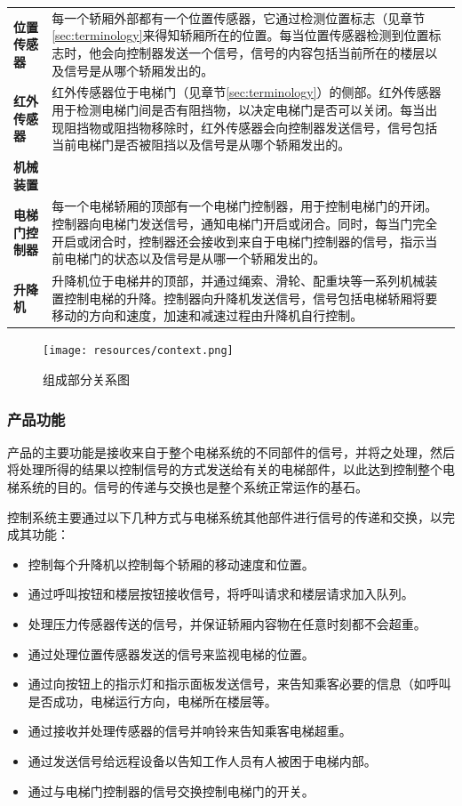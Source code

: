 \begin{longtable}{>{\flushright\textbf\bgroup}m{}<{\egroup} p{}}
	位置传感器 & 每一个轿厢外部都有一个位置传感器，它通过检测位置标志（见章节\ref{sec:terminology}来得知轿厢所在的位置。每当位置传感器检测到位置标志时，他会向控制器发送一个信号，信号的内容包括当前所在的楼层以及信号是从哪个轿厢发出的。\\
	红外传感器 & 红外传感器位于电梯门（见章节\ref{sec:terminology}）的侧部。红外传感器用于检测电梯门间是否有阻挡物，以决定电梯门是否可以关闭。每当出现阻挡物或阻挡物移除时，红外传感器会向控制器发送信号，信号包括当前电梯门是否被阻挡以及信号是从哪个轿厢发出的。\\
	\Large{机械装置} & \\
	电梯门控制器 & 每一个电梯轿厢的顶部有一个电梯门控制器，用于控制电梯门的开闭。控制器向电梯门发送信号，通知电梯门开启或闭合。同时，每当门完全开启或闭合时，控制器还会接收到来自于电梯门控制器的信号，指示当前电梯门的状态以及信号是从哪一个轿厢发出的。\\
	升降机 & 升降机位于电梯井的顶部，并通过绳索、滑轮、配重块等一系列机械装置控制电梯的升降。控制器向升降机发送信号，信号包括电梯轿厢将要移动的方向和速度，加速和减速过程由升降机自行控制。\\
\end{longtable}
\begin{figure}[H]
	\centering
	\texttt{[image: resources/context.png]}
	\caption{组成部分关系图}
	\label{fig:context}
\end{figure}

\subsubsection{产品功能}
\label{sec:productFunction}
产品的主要功能是接收来自于整个电梯系统的不同部件的信号，并将之处理，然后将处理所得的结果以控制信号的方式发送给有关的电梯部件，以此达到控制整个电梯系统的目的。信号的传递与交换也是整个系统正常运作的基石。\par

控制系统主要通过以下几种方式与电梯系统其他部件进行信号的传递和交换，以完成其功能：\par
\begin{itemize}
	\item 控制每个升降机以控制每个轿厢的移动速度和位置。
	\item 通过呼叫按钮和楼层按钮接收信号，将呼叫请求和楼层请求加入队列。
	\item 处理压力传感器传送的信号，并保证轿厢内容物在任意时刻都不会超重。
	\item 通过处理位置传感器发送的信号来监视电梯的位置。
	\item 通过向按钮上的指示灯和指示面板发送信号，来告知乘客必要的信息（如呼叫是否成功，电梯运行方向，电梯所在楼层等。
	\item 通过接收并处理传感器的信号并响铃来告知乘客电梯超重。
	\item 通过发送信号给远程设备以告知工作人员有人被困于电梯内部。
	\item 通过与电梯门控制器的信号交换控制电梯门的开关。
\end{itemize}

